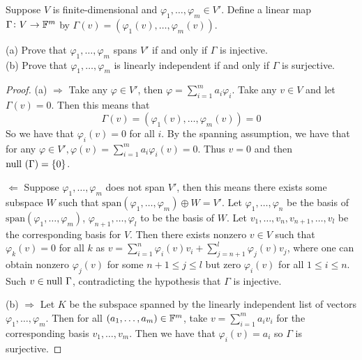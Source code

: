\documentclass{extarticle}
\begin{document}
\begin{problem}{25}
    Suppose \(V\) is finite-dimensional and \(\varphi_1, \ldots, \varphi_m \in V'\). Define 
    a linear map \(\Gamma \colon V \to \mathbb{F}^m\) by \(\Gamma(v)=(\varphi_1(v), \ldots, \varphi_m(v))\). 

    (a) Prove that \(\varphi_1, \ldots, \varphi_m\) spans \(V'\) if and only if \(\Gamma\) is injective. \\ 
    (b) Prove that \(\varphi_1, \ldots, \varphi_m\) is linearly independent 
    if and only if \(\Gamma\) is surjective. 
\end{problem}

\begin{proof}
(a) \(\Rightarrow\) Take any \(\varphi \in V'\), then \(\varphi = \sum_{i=1}^{m} a_i \varphi_i\). Take any 
\(v \in V\) and let \(\Gamma(v) = 0\). Then this means that 
\[\Gamma(v) = (\varphi_1(v), \ldots, \varphi_m(v)) = 0\]
So we have that \(\varphi_i (v) = 0\) for all \(i\). By the spanning assumption, we have that 
for any \(\varphi \in V', \varphi(v) = \sum_{i=1}^{m} a_i \varphi_i(v) = 0\). Thus \(v = 0\) 
and then \(\text{null } (\Gamma) = \{0\}\). 

\(\Leftarrow\) Suppose \(\varphi_1, \ldots, \varphi_m\) does not span \(V'\), then this means there 
exists some subspace \(W\) such that \(\text{span}(\varphi_1, \ldots, \varphi_m)\oplus W = V'\). Let 
\(\varphi_1, \ldots, \varphi_n\) be the basis of \(\text{span}(\varphi_1, \ldots, \varphi_m)\), 
\(\varphi_{n+1}, \ldots, \varphi_{l}\) to be the basis of \(W\). Let \(v_1, \ldots, v_n, 
v_{n+1}, \ldots, v_{l}\) be the corresponding basis for \(V\). Then there exists nonzero \(v \in V\)
such that \(\varphi_k(v) = 0\) for all \(k\) as \(v = \sum_{i=1}^{n} \varphi_i(v) v_i + 
\sum_{j=n+1}^{l} \varphi_j(v) v_j\), where one can obtain nonzero \(\varphi_j(v)\) for some 
\(n+1 \leq j \leq l\) but zero \(\varphi_i(v)\) for all \(1 \leq i \leq n\). Such \(v \in 
\text{null } \Gamma\), contradicting the hypothesis that \(\Gamma\) is injective.


(b) \(\Rightarrow\) Let \(K\) be the subspace spanned by the linearly independent list of vectors 
\(\varphi_1, \ldots, \varphi_m\). Then for all \((a_1, \ldots, a_m) \in \mathbb{F}^m\), take 
\(v = \sum_{i=1}^{m}a_i v_i\) for the corresponding basis \(v_1, \ldots, v_m\). Then  we have that 
\(\varphi_i(v) = a_i\) so \(\Gamma\) is surjective. 


\end{proof}
\end{document}
